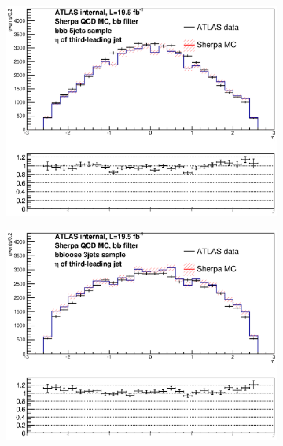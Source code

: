 \begin{figure}[phtb!]
\begin{center}
  \begin{subfigure}[$bbb$ 5+ jet category]{0.3\textwidth}\includegraphics[width=\textwidth]{MonteCarlo/figures/eta2_bbb_5jets.eps}\end{subfigure}
  \begin{subfigure}[$bbloose$ 3 jet category]{0.3\textwidth}\includegraphics[width=\textwidth]{MonteCarlo/figures/eta2_bbloose_3jets.eps}\end{subfigure}

\end{center}
\end{figure}
